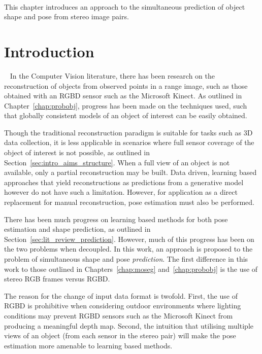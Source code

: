 ~\label{chap:spp}
\begin{chapterabstract}
This chapter introduces an approach to the simultaneous prediction of object shape 
and pose from stereo image pairs.
\end{chapterabstract}

\section{Introduction}
~\label{sec:spp_introduction}
In the Computer Vision literature, there has been research on the reconstruction of objects
from observed points in a range image, such as those obtained with an RGBD sensor such 
as the Microsoft Kinect. As outlined in Chapter~\ref{chap:probobj}, progress has been made 
on the techniques used, such that globally consistent models of an object of interest can be 
easily obtained.

Though the traditional reconstruction paradigm is suitable for tasks such as 3D data 
collection, it is less applicable in scenarios where full sensor coverage of the object 
of interest is not possible, as outlined in Section~\ref{sec:intro_aims_structure}. When a full 
view of an object is not available, only a partial reconstruction may be built. Data driven, 
learning based approaches that yield reconstructions as predictions from a generative model 
however do not have such a limitation. However, for application as a direct replacement for 
manual reconstruction, pose estimation must also be performed.

There has been much progress on learning based methods for both pose estimation and 
shape prediction, as outlined in Section~\ref{sec:lit_review_prediction}. However, much of 
this progress has been on the two problems when decoupled. In this work, an approach is 
proposed to the problem of simultaneous shape and pose \textit{prediction}. The first 
difference in this work to those outlined in Chapters~\ref{chap:moseg} and~\ref{chap:probobj} 
is the use of stereo RGB frames versus RGBD\@. 

The reason for the change of input data format is twofold. First, the use of RGBD is prohibitive 
when considering outdoor environments where lighting conditions may prevent RGBD sensors such as the 
Microsoft Kinect from producing a meaningful depth map. Second, the intuition that utilising multiple 
views of an object (from each sensor in the stereo pair) will make the pose estimation more amenable to 
learning based methods.

